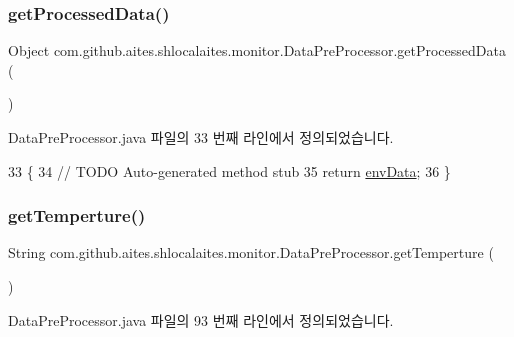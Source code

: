 \subsubsection{\texorpdfstring{get\+Processed\+Data()}{getProcessedData()}}
{\footnotesize\ttfamily Object com.\+github.\+aites.\+shlocalaites.\+monitor.\+Data\+Pre\+Processor.\+get\+Processed\+Data (\begin{DoxyParamCaption}{ }\end{DoxyParamCaption})}



Data\+Pre\+Processor.\+java 파일의 33 번째 라인에서 정의되었습니다.


\begin{DoxyCode}
33                                      \{
34         \textcolor{comment}{// TODO Auto-generated method stub}
35         \textcolor{keywordflow}{return} \mbox{\hyperlink{classcom_1_1github_1_1aites_1_1shlocalaites_1_1monitor_1_1_data_pre_processor_af8a0c4f55f04ec09d3c67c3a37de6bcc}{envData}};
36     \}
\end{DoxyCode}
\mbox{\label{classcom_1_1github_1_1aites_1_1shlocalaites_1_1monitor_1_1_data_pre_processor_a151e8bf6087f2b8d1882fd06bfeb9398}} 
\subsubsection{\texorpdfstring{get\+Temperture()}{getTemperture()}}
{\footnotesize\ttfamily String com.\+github.\+aites.\+shlocalaites.\+monitor.\+Data\+Pre\+Processor.\+get\+Temperture (\begin{DoxyParamCaption}{ }\end{DoxyParamCaption})}



Data\+Pre\+Processor.\+java 파일의 93 번째 라인에서 정의되었습니다.


